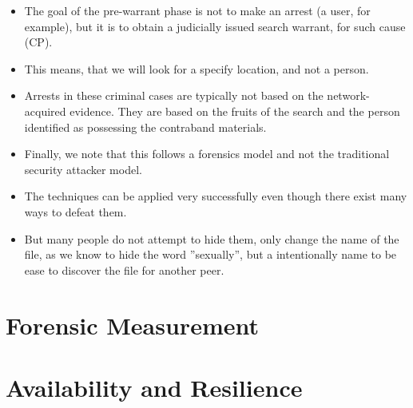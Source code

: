 \documentclass[notes]{beamer}
\begin{document}
\begin{frame}

\begin{itemize}

\item[\checkmark]The goal of the pre-warrant phase is not to make an arrest (a user, for example), but it is to obtain a judicially issued search warrant, for such cause (CP).

\item[\checkmark]This means, that we will look for a specify location, and not a person.

\item[\checkmark]Arrests in these criminal cases are typically not based on the network-acquired evidence. They are based on the fruits of the search and the person identified as possessing the contraband materials.

\end{itemize}

\end{frame}

\begin{frame}

\begin{itemize}

\item[\checkmark]Finally, we note that this follows a forensics model and
not the traditional security attacker model.

\item[\checkmark]The techniques can be applied very successfully even though there exist many ways to defeat them.

\item[\checkmark]But many people do not attempt to hide them, only change the name of the file, as we know to hide the word ''sexually'', but a intentionally name to be ease to discover the file for another peer.

\end{itemize}

\end{frame}

\section{Forensic Measurement}
\begin{frame}

\end{frame}

\section{Availability and Resilience}
\begin{frame}

\end{frame}
\end{document}

